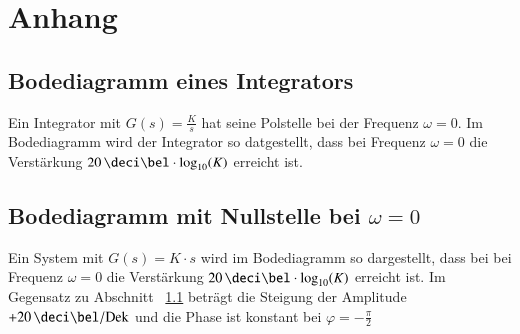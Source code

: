 \section{Anhang}

\subsection{Bodediagramm eines Integrators}
\label{Bodediagramm eines Integrators}

Ein Integrator mit $G(s) = \frac{K}{s}$ hat seine Polstelle bei der Frequenz $\omega = 0$. Im Bodediagramm wird der Integrator so
datgestellt, dass bei Frequenz $\omega = 0$ die Verstärkung $20 \, \deci \bel \cdot \log_{10}(K)$ erreicht ist.



\subsection[Bodediagramm mit Nullstelle bei omega = 0]{Bodediagramm mit Nullstelle bei $\omega = 0$}

Ein System mit $G(s) = K \cdot s$ wird im Bodediagramm so dargestellt, dass bei bei Frequenz $\omega = 0$ die Verstärkung
$20 \, \deci \bel \cdot \log_{10}(K)$ erreicht ist. Im Gegensatz zu Abschnitt ~\ref{Bodediagramm eines Integrators} beträgt die Steigung
der Amplitude $+20 \, \deci \bel / \mathrm{Dek}$ und die Phase ist konstant bei $\varphi = - \frac{\pi}{2}$
